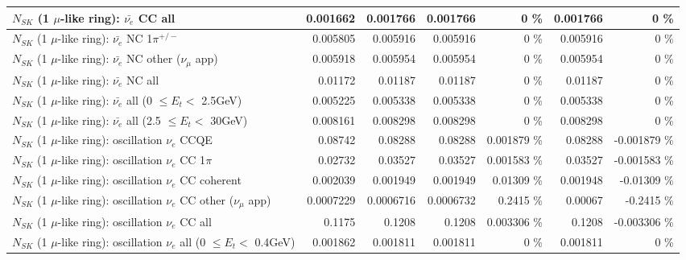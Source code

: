 \begin{table}
\begin{tabular}{| l | r | r | r  r | r  r |}
                            $N_{SK}$ (1 $\mu$-like ring): $\bar{\nu_{e}}$ CC all &        0.001662 &        0.001766 &        0.001766 &        0 \%  &        0.001766 &        0 \%  \\ 
\hline
                     $N_{SK}$ (1 $\mu$-like ring): $\bar{\nu_e}$ NC 1$\pi^{+/-}$ &        0.005805 &        0.005916 &        0.005916 &        0 \%  &        0.005916 &        0 \%  \\ 
            $N_{SK}$ (1 $\mu$-like ring): $\bar{\nu_e}$ NC other ($\nu_\mu$ app) &        0.005918 &        0.005954 &        0.005954 &        0 \%  &        0.005954 &        0 \%  \\ 
                            $N_{SK}$ (1 $\mu$-like ring): $\bar{\nu_{e}}$ NC all &         0.01172 &         0.01187 &         0.01187 &        0 \%  &         0.01187 &        0 \%  \\ 
\hline
     $N_{SK}$ (1 $\mu$-like ring): $\bar{\nu_{e}}$ all (0 $\leq E_{t} <$ 2.5GeV) &        0.005225 &        0.005338 &        0.005338 &        0 \%  &        0.005338 &        0 \%  \\ 
    $N_{SK}$ (1 $\mu$-like ring): $\bar{\nu_{e}}$ all (2.5 $\leq E_{t} <$ 30GeV) &        0.008161 &        0.008298 &        0.008298 &        0 \%  &        0.008298 &        0 \%  \\ 
\hline
\hline
\hline
                          $N_{SK}$ (1 $\mu$-like ring): oscillation $\nu_e$ CCQE &         0.08742 &         0.08288 &         0.08288 & 0.001879 \%  &         0.08288 & -0.001879 \%  \\ 
                     $N_{SK}$ (1 $\mu$-like ring): oscillation $\nu_e$ CC 1$\pi$ &         0.02732 &         0.03527 &         0.03527 & 0.001583 \%  &         0.03527 & -0.001583 \%  \\ 
                   $N_{SK}$ (1 $\mu$-like ring): oscillation $\nu_e$ CC coherent &        0.002039 &        0.001949 &        0.001949 &  0.01309 \%  &        0.001948 & -0.01309 \%  \\ 
      $N_{SK}$ (1 $\mu$-like ring): oscillation $\nu_e$ CC other ($\nu_\mu$ app) &       0.0007229 &       0.0006716 &       0.0006732 &   0.2415 \%  &         0.00067 &  -0.2415 \%  \\ 
                       $N_{SK}$ (1 $\mu$-like ring): oscillation $\nu_e$  CC all &          0.1175 &          0.1208 &          0.1208 & 0.003306 \%  &          0.1208 & -0.003306 \%  \\ 
\hline
$N_{SK}$ (1 $\mu$-like ring): oscillation $\nu_{e}$ all (0 $\leq E_{t} <$ 0.4GeV) &        0.001862 &        0.001811 &        0.001811 &        0 \%  &        0.001811 &        0 \%  \\ 

\end{tabular}
\end{table}
